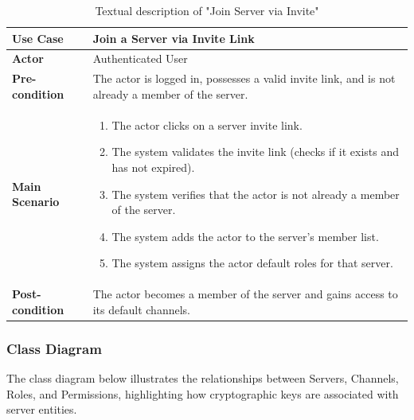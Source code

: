 \renewcommand{\arraystretch}{1.15}
\begin{table}[H]
    \centering
    \begin{tabular}{| p{3.5cm} | p{10.5cm} |}
        \hline
        \textbf{Use Case} & Join a Server via Invite Link \\
        \hline
        \textbf{Actor} & Authenticated User \\
        \hline
        \textbf{Pre-condition} & The actor is logged in, possesses a valid invite link, and is not already a member of the server. \\
        \hline
        \textbf{Main Scenario} & 
        \vspace{-0.5cm}
        \begin{minipage}[t]{10.5cm}
            \begin{enumerate}
                \item The actor clicks on a server invite link.
                \item The system validates the invite link (checks if it exists and has not expired).
                \item The system verifies that the actor is not already a member of the server.
                \item The system adds the actor to the server's member list.
                \item The system assigns the actor default roles for that server.
            \end{enumerate}
            \vspace{-0.2cm}
        \end{minipage} \\
        \hline
        \textbf{Post-condition} & The actor becomes a member of the server and gains access to its default channels. \\
        \hline
    \end{tabular}
    \vspace{0.2cm}
    \caption{Textual description of "Join Server via Invite"}
    \label{tab:usecase_join_server}
\end{table}
\renewcommand{\arraystretch}{1.0}


\subsubsection{Class Diagram}
The class diagram below illustrates the relationships between Servers, Channels, Roles, and Permissions, highlighting how cryptographic keys are associated with server entities.

